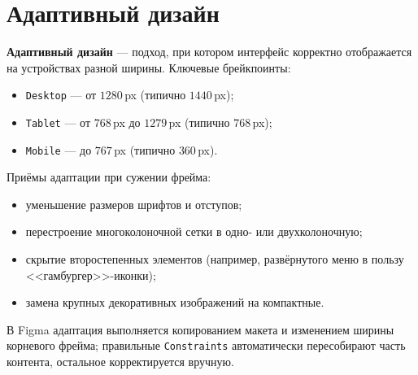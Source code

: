 \section{Адаптивный дизайн}

\textbf{Адаптивный дизайн} — подход, при котором интерфейс корректно
отображается на устройствах разной ширины. Ключевые брейкпоинты:
\begin{itemize}
  \item \texttt{Desktop} — от \(1280\,\)px (типично \(1440\,\)px);
  \item \texttt{Tablet} — от \(768\,\)px до \(1279\,\)px
        (типично \(768\,\)px);
  \item \texttt{Mobile} — до \(767\,\)px (типично \(360\,\)px).
\end{itemize}
Приёмы адаптации при сужении фрейма:
\begin{itemize}
  \item уменьшение размеров шрифтов и отступов;
  \item перестроение многоколоночной сетки в одно- или двухколоночную;
  \item скрытие второстепенных элементов (например, развёрнутого меню
        в пользу <<гамбургер>>-иконки);
  \item замена крупных декоративных изображений на компактные.
\end{itemize}
В Figma адаптация выполняется копированием макета и изменением ширины
корневого фрейма; правильные \texttt{Constraints} автоматически
пересобирают часть контента, остальное корректируется вручную.

\endinput
